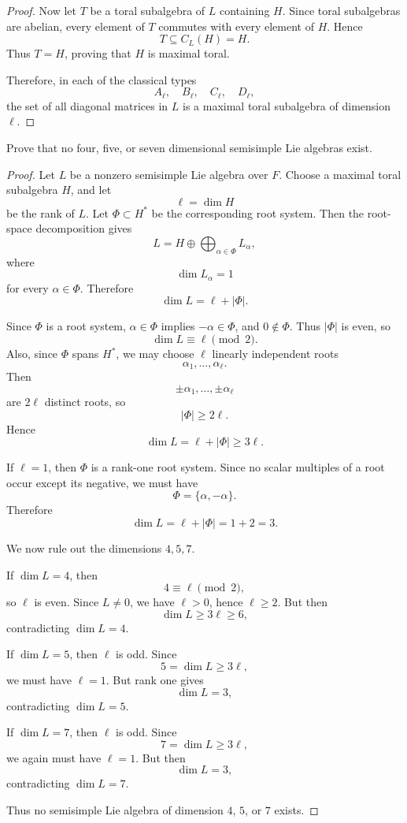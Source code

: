 \begin{proof}
    Now let \(T\) be a toral subalgebra of \(L\) containing \(H\). Since toral subalgebras
    are abelian, every element of \(T\) commutes with every element of \(H\). Hence
    \[
    T\subseteq C_L(H)=H.
    \]
    Thus \(T=H\), proving that \(H\) is maximal toral.
    
    Therefore, in each of the classical types
    \[
    A_\ell,\quad B_\ell,\quad C_\ell,\quad D_\ell,
    \]
    the set of all diagonal matrices in \(L\) is a maximal toral subalgebra of dimension
    \(\ell\).
    \end{proof}

\begin{exercise}
    [P41, Ex10] Prove that no four, five, or seven dimensional semisimple Lie algebras exist.
\end{exercise}

\begin{proof}
    Let \(L\) be a nonzero semisimple Lie algebra over \(F\). Choose a maximal toral
    subalgebra \(H\), and let
    \[
    \ell=\dim H
    \]
    be the rank of \(L\). Let \(\Phi\subset H^*\) be the corresponding root system.
    Then the root-space decomposition gives
    \[
    L
    =
    H\oplus \bigoplus_{\alpha\in\Phi} L_\alpha,
    \]
    where
    \[
    \dim L_\alpha=1
    \]
    for every \(\alpha\in\Phi\). Therefore
    \[
    \dim L=\ell+|\Phi|.
    \]
    
    Since \(\Phi\) is a root system, \(\alpha\in\Phi\) implies \(-\alpha\in\Phi\), and
    \(0\notin\Phi\). Thus \(|\Phi|\) is even, so
    \[
    \dim L\equiv \ell \pmod 2.
    \]
    Also, since \(\Phi\) spans \(H^*\), we may choose \(\ell\) linearly independent
    roots
    \[
    \alpha_1,\ldots,\alpha_\ell.
    \]
    Then
    \[
    \pm\alpha_1,\ldots,\pm\alpha_\ell
    \]
    are \(2\ell\) distinct roots, so
    \[
    |\Phi|\geq 2\ell.
    \]
    Hence
    \[
    \dim L=\ell+|\Phi|\geq 3\ell.
    \]
    
    If \(\ell=1\), then \(\Phi\) is a rank-one root system. Since no scalar multiples of
    a root occur except its negative, we must have
    \[
    \Phi=\{\alpha,-\alpha\}.
    \]
    Therefore
    \[
    \dim L=\ell+|\Phi|=1+2=3.
    \]
    
    We now rule out the dimensions \(4,5,7\).
    
    If \(\dim L=4\), then
    \[
    4\equiv \ell \pmod 2,
    \]
    so \(\ell\) is even. Since \(L\neq 0\), we have \(\ell>0\), hence \(\ell\geq 2\).
    But then
    \[
    \dim L\geq 3\ell\geq 6,
    \]
    contradicting \(\dim L=4\).
    
    If \(\dim L=5\), then \(\ell\) is odd. Since
    \[
    5=\dim L\geq 3\ell,
    \]
    we must have \(\ell=1\). But rank one gives
    \[
    \dim L=3,
    \]
    contradicting \(\dim L=5\).
    
    If \(\dim L=7\), then \(\ell\) is odd. Since
    \[
    7=\dim L\geq 3\ell,
    \]
    we again must have \(\ell=1\). But then
    \[
    \dim L=3,
    \]
    contradicting \(\dim L=7\).
    
    Thus no semisimple Lie algebra of dimension \(4\), \(5\), or \(7\) exists.
    \end{proof}
